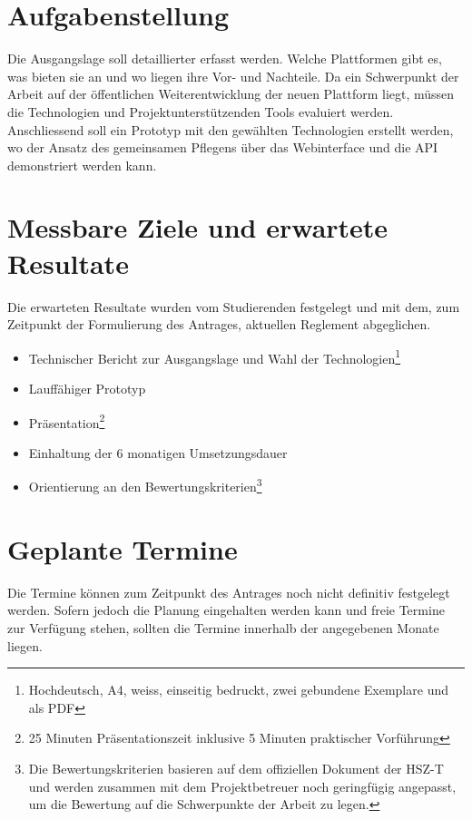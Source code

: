 \documentclass[]{scrreprt}
\begin{document}
    \section{Aufgabenstellung}
    Die Ausgangslage soll detaillierter erfasst werden. Welche Plattformen
    gibt es, was bieten sie an und wo liegen ihre Vor- und Nachteile.
    Da ein Schwerpunkt der Arbeit auf der öffentlichen Weiterentwicklung der
    neuen Plattform liegt, müssen die Technologien und Projektunterstützenden 
    Tools evaluiert werden.
    Anschliessend soll ein Prototyp mit den gewählten Technologien erstellt
    werden, wo der Ansatz des gemeinsamen Pflegens über das Webinterface und 
    die API demonstriert werden kann.

    \section{Messbare Ziele und erwartete Resultate}
    Die erwarteten Resultate wurden vom Studierenden festgelegt und mit dem, 
    zum Zeitpunkt der Formulierung des Antrages, aktuellen 
    Reglement\cite{reglement} abgeglichen.
    
    \begin{itemize}
        \item Technischer Bericht zur Ausgangslage und Wahl der 
            Technologien\footnote{Hochdeutsch, A4, weiss, einseitig 
    	    bedruckt, zwei gebundene Exemplare und als PDF}
    	\item Lauffähiger Prototyp
        \item Präsentation\footnote{25 Minuten Präsentationszeit inklusive 5 
            Minuten praktischer Vorführung}
        \item Einhaltung der 6 monatigen Umsetzungsdauer
        \item Orientierung an den Bewertungskriterien\footnote{Die 
            Bewertungskriterien basieren auf dem offiziellen 
            Dokument\cite{bewertungskriterien} der HSZ-T und werden zusammen 
            mit dem Projektbetreuer noch geringfügig angepasst, um die
            Bewertung auf die Schwerpunkte der Arbeit zu legen.}
    \end{itemize}

    \section{Geplante Termine}
    Die Termine können zum Zeitpunkt des Antrages noch nicht definitiv 
    festgelegt werden. Sofern jedoch die Planung eingehalten werden kann und 
    freie Termine zur Verfügung stehen, sollten die Termine innerhalb der 
    angegebenen Monate liegen.
\end{document}
